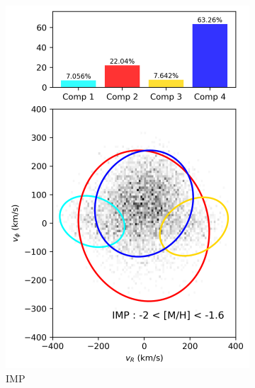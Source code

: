 \documentclass[a4paper,10pt]{article}
\begin{document}
\begin{multicols}{2}
\begin{figure}[H]
\begin{subfigure}[t]{0.24\linewidth}
    \includegraphics[width=\linewidth]{../figures/gmm_IMP.png}
    \caption{IMP}
    \label{fig:gmm_imp}
  \end{subfigure}
  \hfill
  \begin{subfigure}[t]{0.24\linewidth}

\end{subfigure}
\end{figure}
\end{multicols}
\end{document}
